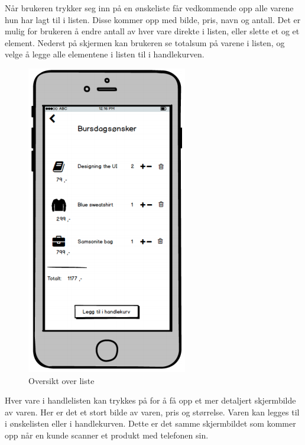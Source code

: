 \noindent Når brukeren trykker seg inn på en ønskeliste får vedkommende opp alle varene hun har lagt til i listen. Disse kommer opp med bilde, pris, navn og antall. Det er mulig for brukeren å endre antall av hver vare direkte i listen, eller slette et og et element. Nederst på skjermen kan brukeren se totalsum på varene i listen, og velge å legge alle elementene i listen til i handlekurven.

\begin{figure}[H]
\includegraphics[scale=0.5]{images/prototype1/oversiktliste}
\centering %
\caption{Oversikt over liste}
\label{fig:oversiktliste}
\end{figure}

Hver vare i handlelisten kan trykkes på for å få opp et mer detaljert skjermbilde av varen. Her er det et stort bilde av varen, pris og størrelse. Varen kan legges til i ønskelisten eller i handlekurven. Dette er det samme skjermbildet som kommer opp når en kunde scanner et produkt med telefonen sin.

